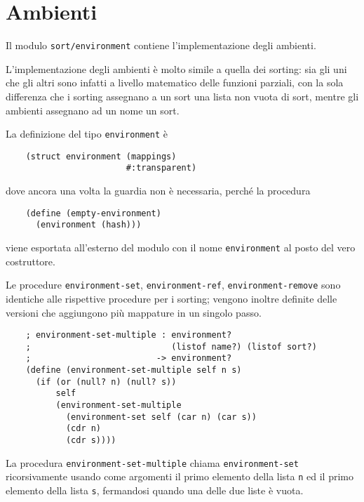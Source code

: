 \section{Ambienti}

Il modulo \lstinline{sort/environment} contiene l'implementazione degli
ambienti.

L'implementazione degli ambienti \`e molto simile a quella dei sorting:
sia gli uni che gli altri sono infatti a livello matematico delle
funzioni parziali, con la sola differenza che i sorting assegnano a
un sort una lista non vuota di sort, mentre gli ambienti assegnano ad
un nome un sort.

La definizione del tipo \lstinline{environment} \`e

\begin{lstlisting}
    (struct environment (mappings)
                        #:transparent)
\end{lstlisting}

dove ancora una volta la guardia non \`e necessaria, perch\'e la
procedura

\begin{lstlisting}
    (define (empty-environment)
      (environment (hash)))
\end{lstlisting}

viene esportata all'esterno del modulo con il nome
\lstinline{environment} al posto del vero costruttore.

Le procedure \lstinline{environment-set}, \lstinline{environment-ref},
\lstinline{environment-remove} sono identiche alle rispettive procedure
per i sorting; vengono inoltre definite delle versioni che aggiungono
pi\`u mappature in un singolo passo.

\begin{lstlisting}
    ; environment-set-multiple : environment?
    ;                            (listof name?) (listof sort?)
    ;                         -> environment?
    (define (environment-set-multiple self n s)
      (if (or (null? n) (null? s))
          self
          (environment-set-multiple
            (environment-set self (car n) (car s))
            (cdr n)
            (cdr s))))
\end{lstlisting}

La procedura \lstinline{environment-set-multiple} chiama
\lstinline{environment-set} ricorsivamente usando come argomenti il
primo elemento della lista \lstinline{n} ed il primo elemento della lista
\lstinline{s}, fermandosi quando una delle due liste \`e vuota.

